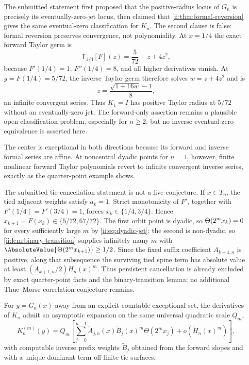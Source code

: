 \begin{warning}
\label{ii:warn:trichotomy}
The submitted statement first proposed that the positive-radius locus of $G_n$ is
precisely its eventually-zero-jet locus, then claimed that
\cref{ii:thm:formal-reversion} gives the same eventual-zero classification for $K_n$.
The second clause is false: formal reversion preserves convergence, not polynomiality.
At $x=1/4$ the exact forward Taylor germ is
\[
 \mathsf T_{1/4}[F](z)=\frac5{72}+z+4z^2,
\]
because $F'(1/4)=1$, $F''(1/4)=8$, and all higher derivatives vanish.  At
$y=F(1/4)=5/72$, the inverse Taylor germ therefore solves $w=z+4z^2$ and is
\[
 z=\frac{\sqrt{1+16w}-1}{8},
\]
an infinite convergent series.  Thus $K_1=I$ has positive Taylor radius at $5/72$
without an eventually-zero jet.  The forward-only assertion remains a plausible open
classification problem, especially for $n\geq2$, but no inverse eventual-zero
equivalence is asserted here.
\end{warning}

The center is exceptional in both directions because its forward and inverse formal
series are affine.  At noncentral dyadic points for $n=1$, however, finite nonlinear
forward Taylor polynomials revert to infinite convergent inverse series, exactly as the
quarter-point example shows.

\begin{warning}
\label{ii:warn:ties}
The submitted tie-cancellation statement is not a live conjecture.  If
$x\in T_n$, the tied adjacent weights satisfy $a_k=1$.  Strict monotonicity of $F'$,
together with $F'(1/4)=F'(3/4)=1$, forces
$x_k\in\{1/4,3/4\}$.  Hence
$x_{k+1}=F(x_k)\in\{5/72,67/72\}$.  The first orbit point is dyadic, so
$\Theta(2^m x_k)=0$ for every sufficiently large $m$ by
\eqref{ii:eq:dyadic-jet}; the second is non-dyadic, so
\cref{ii:lem:binary-transition} supplies infinitely many $m$ with
$\AbsoluteValue{\ThetaF(2^m x_{k+1})}\geq1/2$.  Since the fixed suffix coefficient
$A_{k+1,n}$ is positive, along that subsequence the surviving tied spine term has
absolute value at least $(A_{k+1,n}/2)H_n(x)^m$.  Thus persistent cancellation is
already excluded by exact quarter-point facts and the binary-transition lemma; no
additional Thue--Morse correlation conjecture remains.
\end{warning}

\begin{conjecture}
\label{ii:conj:inverse-spine}
For $y=G_n(x)$ away from an explicit countable exceptional set, the derivatives of
$K_n$ admit an asymptotic expansion on the same universal quadratic scale $Q_m$,
\[
 K_n^{(m)}(y)=Q_m\left[
   \sum_{j=0}^{n-1}\widetilde A_{j,n}(x)
   \widetilde B_j(x)^m\Theta(2^m x_j)
   +o(\widetilde H_n(x)^m)
 \right],
\]
with computable inverse prefix weights $\widetilde B_j$ obtained from the forward
slopes and with a unique dominant term off finite tie surfaces.
\end{conjecture}

